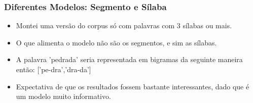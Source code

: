 \documentclass[xcolor=table]{beamer}
\begin{document}
	\begin{frame}
		\frametitle{Diferentes Modelos: Segmento e Sílaba}
		\begin{itemize}
			\item Montei uma versão do corpus só com palavras com 3 sílabas ou mais.\\
			\item O que alimenta o modelo não são os segmentos, e sim as sílabas.\\
			\item A palavra 'pedrada' seria representada em bigramas da seguinte maneira então:  ['pe-dra','dra-da']\\
			\item Expectativa de que os resultados fossem bastante interessantes, dado que é um modelo muito informativo.\\
		\end{itemize}
	\end{frame}	
\end{document}
